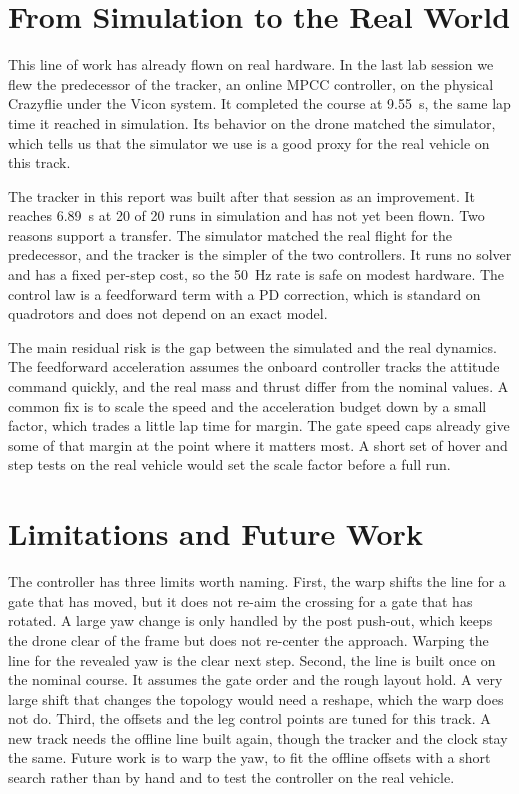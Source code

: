 \documentclass[conference]{IEEEtran}
\begin{document}
\section{From Simulation to the Real World}
\label{sec:deploy}
This line of work has already flown on real hardware. In the last lab session we flew the predecessor of the tracker, an online MPCC controller, on the physical Crazyflie under the Vicon system. It completed the course at 9.55~s, the same lap time it reached in simulation. Its behavior on the drone matched the simulator, which tells us that the simulator we use is a good proxy for the real vehicle on this track.

The tracker in this report was built after that session as an improvement. It reaches 6.89~s at 20 of 20 runs in simulation and has not yet been flown. Two reasons support a transfer. The simulator matched the real flight for the predecessor, and the tracker is the simpler of the two controllers. It runs no solver and has a fixed per-step cost, so the 50~Hz rate is safe on modest hardware. The control law is a feedforward term with a PD correction, which is standard on quadrotors and does not depend on an exact model.

The main residual risk is the gap between the simulated and the real dynamics. The feedforward acceleration assumes the onboard controller tracks the attitude command quickly, and the real mass and thrust differ from the nominal values. A common fix is to scale the speed and the acceleration budget down by a small factor, which trades a little lap time for margin. The gate speed caps already give some of that margin at the point where it matters most. A short set of hover and step tests on the real vehicle would set the scale factor before a full run.

\section{Limitations and Future Work}
\label{sec:limits}
The controller has three limits worth naming. First, the warp shifts the line for a gate that has moved, but it does not re-aim the crossing for a gate that has rotated. A large yaw change is only handled by the post push-out, which keeps the drone clear of the frame but does not re-center the approach. Warping the line for the revealed yaw is the clear next step. Second, the line is built once on the nominal course. It assumes the gate order and the rough layout hold. A very large shift that changes the topology would need a reshape, which the warp does not do. Third, the offsets and the leg control points are tuned for this track. A new track needs the offline line built again, though the tracker and the clock stay the same. Future work is to warp the yaw, to fit the offline offsets with a short search rather than by hand and to test the controller on the real vehicle.
\end{document}
